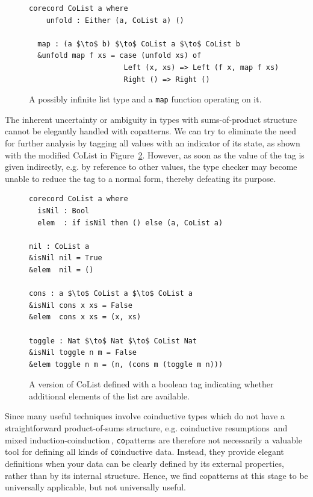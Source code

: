\begin{figure}[h]
\begin{lstlisting}[mathescape]
  corecord CoList a where
    unfold : Either (a, CoList a) ()

  map : (a $\to$ b) $\to$ CoList a $\to$ CoList b 
  &unfold map f xs = case (unfold xs) of
                      Left (x, xs) => Left (f x, map f xs)
                      Right () => Right ()
\end{lstlisting}
  \caption{A possibly infinite list type and a \texttt{map} function operating on it.}
  \label{fig:colist}
\end{figure}

The inherent uncertainty or ambiguity in types with sums-of-product structure
cannot be elegantly handled with copatterns. We can try to eliminate the need
for further analysis by tagging all values with an indicator of its state, as
shown with the modified CoList in Figure~\ref{fig:dependent_colist}. However, as
soon as the value of the tag is given indirectly, e.g. by reference to other values,
the type checker may become unable to reduce the tag to a normal form, thereby
defeating its purpose.

\begin{figure}[h]
\begin{lstlisting}[mathescape]
corecord CoList a where
  isNil : Bool
  elem  : if isNil then () else (a, CoList a)

nil : CoList a
&isNil nil = True
&elem  nil = ()

cons : a $\to$ CoList a $\to$ CoList a
&isNil cons x xs = False
&elem  cons x xs = (x, xs)

toggle : Nat $\to$ Nat $\to$ CoList Nat
&isNil toggle n m = False
&elem toggle n m = (n, (cons m (toggle m n)))
\end{lstlisting}
\caption{A version of CoList defined with a boolean tag indicating whether
  additional elements of the list are available.}
\label{fig:dependent_colist}
\end{figure}

Since many useful techniques involve coinductive types which do not have a
straightforward product-of-sums structure, e.g. coinductive
resumptions\,\citep{Pirog2014273} and mixed
induction-coinduction\,\citep{Danielsson09mixinginduction}, \texttt{co}patterns
are therefore not necessarily a valuable tool for defining all kinds of
\texttt{co}inductive data. Instead, they provide elegant definitions when your data can be
clearly defined by its external properties, rather than by its internal
structure. Hence, we find copatterns at this stage to be universally applicable, but not
universally useful.


